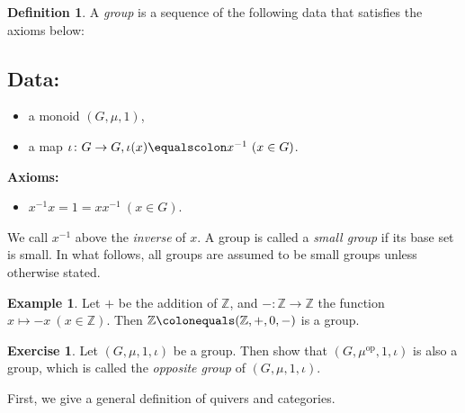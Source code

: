 \documentclass{surv-l}
\numberwithin{equation}{chapter}
\numberwithin{figure}{chapter}
\theoremstyle{plain}
\theoremstyle{definition}
\newtheorem{dfn}[thm]{Definition}
\newtheorem{exm}[thm]{Example}
\newtheorem{exc}[thm]{Exercise}
\theoremstyle{remark}
\begin{document}
\begin{dfn}
A \emph{group} is a sequence of the following data that satisfies
the axioms below:

\subsection*{Data:}
\begin{itemize}
\item
a monoid  $(G, \mu, 1)$,
\item
a map $\iota \colon G \to G, \iota(x) \equalscolon x^{-1}\ (x \in G)$.
\end{itemize}
{\bf Axioms:}
\begin{itemize}
\item
$x^{-1} x = 1 = x x^{-1}\ (x \in G)$.
\end{itemize}
We call $x^{-1}$ above the \emph{inverse} of $x$.
A group is called a \emph{small group} if its base set is small.
In what follows, all groups are assumed to be small groups unless otherwise stated.
\end{dfn}

\begin{exm}
Let $+$ be the addition of $\mathbb{Z}$, and
$- \colon \mathbb{Z} \to \mathbb{Z}$ the function $x \mapsto -x\ (x \in \mathbb{Z})$.
Then
$\mathbb{Z}\colonequals  (\mathbb{Z}, +, 0, -)$ is a group.
\end{exm}

\begin{exc}
Let $(G, \mu, 1, \iota)$ be a group.
Then show that $(G, \mu^{\mathrm{op}}, 1, \iota)$ is also a group, which is called
the \emph{opposite group} of  $(G, \mu, 1, \iota)$.
\end{exc}

First, we give a general definition of quivers and categories.
\end{document}

